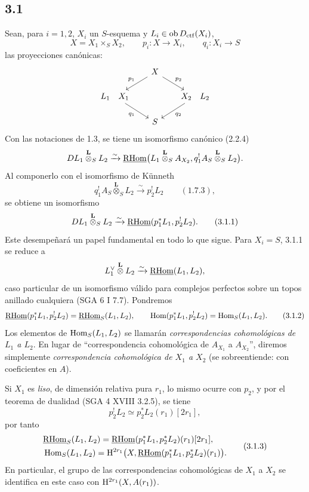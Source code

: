 \subsection*{3.1}
Sean, para $i=1,2$, $X_i$ un $S$-esquema y $L_i\in\operatorname{ob}D_{\mathrm{ctf}}(X_i)$,
\[
X=X_1\times_S X_2,
\qquad
p_i:X\longrightarrow X_i,
\qquad
q_i:X_i\longrightarrow S
\]
las proyecciones canónicas:
\[
\begin{tikzcd}[column sep=1.8em,row sep=1.5em]
& X \arrow[dl,"p_1"'] \arrow[dr,"p_2"] & \\
L_1\quad X_1 \arrow[dr,"q_1"'] & & X_2\quad L_2 \arrow[dl,"q_2"] \\
& S &
\end{tikzcd}
\]
Con las notaciones de 1.3, se tiene un isomorfismo canónico (2.2.4)
\[
DL_1\overset{\mathbf L}{\otimes}_S L_2
\xrightarrow{\sim}
\underline{\mathrm{RHom}}\bigl(L_1\overset{\mathbf L}{\otimes}_S A_{X_2},
q_1^!A_S\overset{\mathbf L}{\otimes}_S L_2\bigr).
\]
Al componerlo con el isomorfismo de Künneth
\[
q_1^!A_S\overset{\mathbf L}{\otimes}_S L_2
\xrightarrow{\sim}p_2^!L_2 \qquad (1.7.3),
\]
se obtiene un isomorfismo
\begin{equation}
DL_1\overset{\mathbf L}{\otimes}_S L_2
\xrightarrow{\sim}
\underline{\mathrm{RHom}}(p_1^*L_1,p_2^!L_2).
\tag{3.1.1}
\end{equation}
Este desempeñará un papel fundamental en todo lo que sigue. Para $X_i=S$, 3.1.1 se reduce a
\[
L_1^\vee\overset{\mathbf L}{\otimes}L_2\xrightarrow{\sim}\underline{\mathrm{RHom}}(L_1,L_2),
\]
caso particular de un isomorfismo válido para complejos perfectos sobre un topos anillado cualquiera (SGA 6 I 7.7). Pondremos
\begin{equation}
\underline{\mathrm{RHom}}(p_1^*L_1,p_2^!L_2)=\underline{\mathrm{RHom}}_S(L_1,L_2),
\qquad
\operatorname{Hom}(p_1^*L_1,p_2^!L_2)=\operatorname{Hom}_S(L_1,L_2).
\tag{3.1.2}
\end{equation}
Los elementos de $\operatorname{Hom}_S(L_1,L_2)$ se llamarán \emph{correspondencias cohomológicas de $L_1$ a $L_2$}. En lugar de ``correspondencia cohomológica de $A_{X_1}$ a $A_{X_2}$'', diremos simplemente \emph{correspondencia cohomológica de $X_1$ a $X_2$} (se sobreentiende: con coeficientes en $A$).

Si $X_1$ es \emph{liso}, de dimensión relativa pura $r_1$, lo mismo ocurre con $p_2$, y por el teorema de dualidad (SGA 4 XVIII 3.2.5), se tiene
\[
p_2^!L_2\simeq p_2^*L_2(r_1)[2r_1],
\]
por tanto
\begin{equation}
\begin{aligned}
&\underline{\mathrm{RHom}}_S(L_1,L_2)=\underline{\mathrm{RHom}}(p_1^*L_1,p_2^*L_2)(r_1)[2r_1],\\
&\operatorname{Hom}_S(L_1,L_2)=\mathrm{H}^{2r_1}\bigl(X,\underline{\mathrm{RHom}}(p_1^*L_1,p_2^*L_2)(r_1)\bigr).
\end{aligned}
\tag{3.1.3}
\end{equation}
En particular, el grupo de las correspondencias cohomológicas de $X_1$ a $X_2$ se identifica en este caso con $\mathrm{H}^{2r_1}(X,A(r_1))$.

